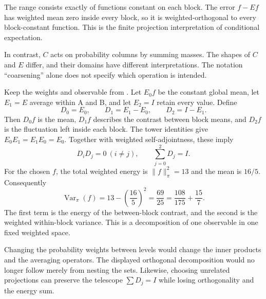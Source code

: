 The range consists exactly of functions constant on each block. The error $f-Ef$ has weighted mean zero inside every block, so it is weighted-orthogonal to every block-constant function. This is the finite projection interpretation of conditional expectation.

In contrast, $C$ acts on probability columns by summing masses. The shapes of $C$ and $E$ differ, and their domains have different interpretations. The notation ``coarsening'' alone does not specify which operation is intended.

Keep the weights and observable from . Let $E_0f$ be the constant global mean, let $E_1=E$ average within A and B, and let $E_2=I$ retain every value. Define
\[
D_0=E_0,\qquad D_1=E_1-E_0,\qquad D_2=I-E_1.
\]
Then $D_0f$ is the mean, $D_1f$ describes the contrast between block means, and $D_2f$ is the fluctuation left inside each block.
The tower identities give $E_0E_1=E_1E_0=E_0$. Together with weighted self-adjointness, these imply
\[
D_iD_j=0\ (i\ne j),\qquad \sum_{j=0}^2 D_j=I.
\]
For the chosen $f$, the total weighted energy is $\|f\|_\pi^2=13$ and the mean is $16/5$. Consequently
\[
\operatorname{Var}_\pi(f)
=13-\left(\frac{16}{5}\right)^2
=\frac{69}{25}
=\frac{108}{175}+\frac{15}{7}.
\]
The first term is the energy of the between-block contrast, and the second is the weighted within-block variance. This is a decomposition of one observable in one fixed weighted space.

Changing the probability weights between levels would change the inner products and the averaging operators. The displayed orthogonal decomposition would no longer follow merely from nesting the sets. Likewise, choosing unrelated projections can preserve the telescope $\sum D_j=I$ while losing orthogonality and the energy sum.

